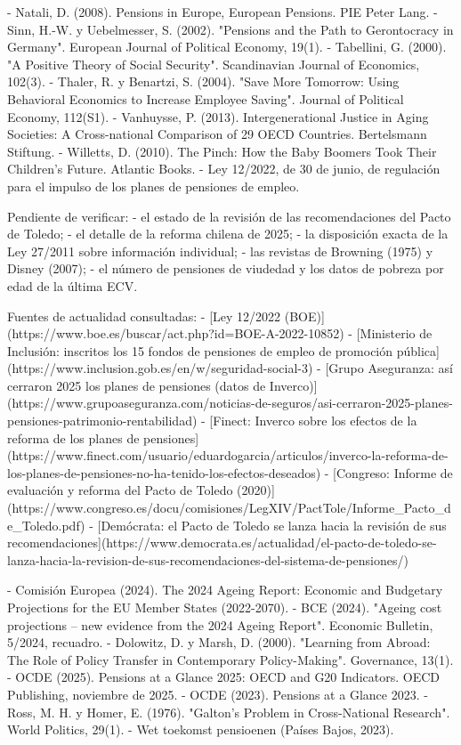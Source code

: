 \documentclass[10pt,a4paper]{article}
\begin{document}
- Natali, D. (2008). Pensions in Europe, European Pensions. PIE Peter Lang.
- Sinn, H.-W. y Uebelmesser, S. (2002). "Pensions and the Path to Gerontocracy in Germany". European Journal of Political Economy, 19(1).
- Tabellini, G. (2000). "A Positive Theory of Social Security". Scandinavian Journal of Economics, 102(3).
- Thaler, R. y Benartzi, S. (2004). "Save More Tomorrow: Using Behavioral Economics to Increase Employee Saving". Journal of Political Economy, 112(S1).
- Vanhuysse, P. (2013). Intergenerational Justice in Aging Societies: A Cross-national Comparison of 29 OECD Countries. Bertelsmann Stiftung.
- Willetts, D. (2010). The Pinch: How the Baby Boomers Took Their Children's Future. Atlantic Books.
- Ley 12/2022, de 30 de junio, de regulación para el impulso de los planes de pensiones de empleo.

Pendiente de verificar:
- el estado de la revisión de las recomendaciones del Pacto de Toledo;
- el detalle de la reforma chilena de 2025;
- la disposición exacta de la Ley 27/2011 sobre información individual;
- las revistas de Browning (1975) y Disney (2007);
- el número de pensiones de viudedad y los datos de pobreza por edad de la última ECV.

Fuentes de actualidad consultadas:
- [Ley 12/2022 (BOE)](https://www.boe.es/buscar/act.php?id=BOE-A-2022-10852)
- [Ministerio de Inclusión: inscritos los 15 fondos de pensiones de empleo de promoción pública](https://www.inclusion.gob.es/en/w/seguridad-social-3)
- [Grupo Aseguranza: así cerraron 2025 los planes de pensiones (datos de Inverco)](https://www.grupoaseguranza.com/noticias-de-seguros/asi-cerraron-2025-planes-pensiones-patrimonio-rentabilidad)
- [Finect: Inverco sobre los efectos de la reforma de los planes de pensiones](https://www.finect.com/usuario/eduardogarcia/articulos/inverco-la-reforma-de-los-planes-de-pensiones-no-ha-tenido-los-efectos-deseados)
- [Congreso: Informe de evaluación y reforma del Pacto de Toledo (2020)](https://www.congreso.es/docu/comisiones/LegXIV/PactTole/Informe_Pacto_de_Toledo.pdf)
- [Demócrata: el Pacto de Toledo se lanza hacia la revisión de sus recomendaciones](https://www.democrata.es/actualidad/el-pacto-de-toledo-se-lanza-hacia-la-revision-de-sus-recomendaciones-del-sistema-de-pensiones/)

- Comisión Europea (2024). The 2024 Ageing Report: Economic and Budgetary Projections for the EU Member States (2022-2070).
- BCE (2024). "Ageing cost projections – new evidence from the 2024 Ageing Report". Economic Bulletin, 5/2024, recuadro.
- Dolowitz, D. y Marsh, D. (2000). "Learning from Abroad: The Role of Policy Transfer in Contemporary Policy-Making". Governance, 13(1).
- OCDE (2025). Pensions at a Glance 2025: OECD and G20 Indicators. OECD Publishing, noviembre de 2025.
- OCDE (2023). Pensions at a Glance 2023.
- Ross, M. H. y Homer, E. (1976). "Galton's Problem in Cross-National Research". World Politics, 29(1).
- Wet toekomst pensioenen (Países Bajos, 2023).
\end{document}

